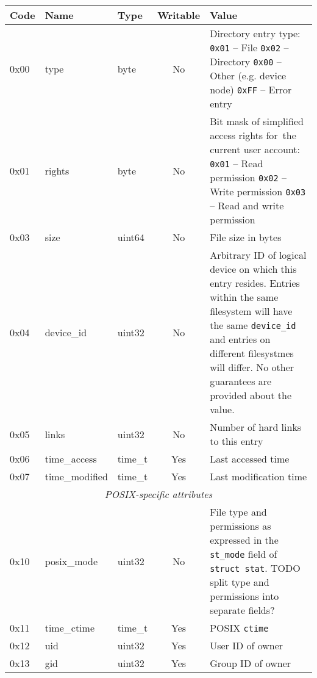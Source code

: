 \begin{table}[p]
\begin{center}

\def\tline#1#2#3{
{\ttfamily #1} & {\ttfamily #2} & {\ttfamily #3}
}
\begin{tabular}{|lllcp{6cm}|}
	\hline
	Code & Name & Type & Writable & Value \\
	\hline
	\tline{0x00}{type}{byte} & No &
		Directory entry type: \newline
		{\tt 0x01} -- File \newline
		{\tt 0x02} -- Directory \newline
		{\tt 0x00} -- Other (e.g. device node) \newline
		{\tt 0xFF} -- Error entry
		\\
	\tline{0x01}{rights}{byte} & No &
		Bit mask of simplified access rights for~the current user account:\newline
		{\tt 0x01} -- Read permission \newline
		{\tt 0x02} -- Write permission \newline
		{\tt 0x03} -- Read and write permission
		\\
	\tline{0x03}{size}{uint64} & No & File size in bytes \\
	\tline{0x04}{device\_id}{uint32} & No &
		Arbitrary ID of logical device on which this entry resides.
		Entries within the same filesystem will have the same {\tt device\_id}
		and entries on different filesystmes will differ. No other guarantees
		are provided about the value.
		\\
	\tline{0x05}{links}{uint32} & No & Number of hard links to this entry \\
	\tline{0x06}{time\_access}{time\_t} & Yes & Last accessed time \\
	\tline{0x07}{time\_modified}{time\_t} & Yes & Last modification time \\

	\hline
	\multicolumn{5}{|c|}{\textit{POSIX-specific attributes}} \\
	\hline

	\tline{0x10}{posix\_mode}{uint32} & No &
		File type and permissions as expressed in the {\tt st\_mode} field
		of {\tt struct stat}.\newline
		TODO split type and permissions into separate fields?
		\\
	\tline{0x11}{time\_ctime}{time\_t} & Yes & POSIX {\tt ctime} \\
	\tline{0x12}{uid}{uint32} & Yes & User ID of owner \\
	\tline{0x13}{gid}{uint32} & Yes & Group ID of owner \\


\end{tabular}
\end{center}
\end{table}
